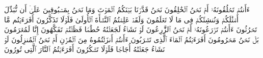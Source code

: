 \stopbuffer%
\startbuffer[\q:56:59]
ءَأَنتُمۡ تَخۡلُقُونَهُۥۤ أَمۡ نَحۡنُ ٱلۡخَٰلِقُونَ%
\stopbuffer%
\startbuffer[\q:56:60]
نَحۡنُ قَدَّرۡنَا بَیۡنَكُمُ ٱلۡمَوۡتَ وَمَا نَحۡنُ بِمَسۡبُوقِینَ%
\stopbuffer%
\startbuffer[\q:56:61]
عَلَىٰۤ أَن نُّبَدِّلَ أَمۡثَٰلَكُمۡ وَنُنشِئَكُمۡ فِی مَا لَا تَعۡلَمُونَ%
\stopbuffer%
\startbuffer[\q:56:62]
وَلَقَدۡ عَلِمۡتُمُ ٱلنَّشۡأَةَ ٱلۡأُولَىٰ فَلَوۡلَا تَذَكَّرُونَ%
\stopbuffer%
\startbuffer[\q:56:63]
أَفَرَءَیۡتُم مَّا تَحۡرُثُونَ%
\stopbuffer%
\startbuffer[\q:56:64]
ءَأَنتُمۡ تَزۡرَعُونَهُۥۤ أَمۡ نَحۡنُ ٱلزَّٰرِعُونَ%
\stopbuffer%
\startbuffer[\q:56:65]
لَوۡ نَشَاۤءُ لَجَعَلۡنَٰهُ حُطَٰمࣰا فَظَلۡتُمۡ تَفَكَّهُونَ%
\stopbuffer%
\startbuffer[\q:56:66]
إِنَّا لَمُغۡرَمُونَ%
\stopbuffer%
\startbuffer[\q:56:67]
بَلۡ نَحۡنُ مَحۡرُومُونَ%
\stopbuffer%
\startbuffer[\q:56:68]
أَفَرَءَیۡتُمُ ٱلۡمَاۤءَ ٱلَّذِی تَشۡرَبُونَ%
\stopbuffer%
\startbuffer[\q:56:69]
ءَأَنتُمۡ أَنزَلۡتُمُوهُ مِنَ ٱلۡمُزۡنِ أَمۡ نَحۡنُ ٱلۡمُنزِلُونَ%
\stopbuffer%
\startbuffer[\q:56:70]
لَوۡ نَشَاۤءُ جَعَلۡنَٰهُ أُجَاجࣰا فَلَوۡلَا تَشۡكُرُونَ%
\stopbuffer%
\startbuffer[\q:56:71]
أَفَرَءَیۡتُمُ ٱلنَّارَ ٱلَّتِی تُورُونَ%
\stopbuffer%
